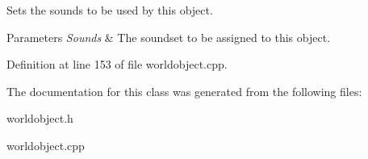 Sets the sounds to be used by this object. 


\begin{DoxyParams}{Parameters}
{\em Sounds} & The soundset to be assigned to this object. \\
\hline
\end{DoxyParams}


Definition at line 153 of file worldobject.cpp.



The documentation for this class was generated from the following files:\begin{DoxyCompactItemize}
\item 
worldobject.h\item 
worldobject.cpp\end{DoxyCompactItemize}
